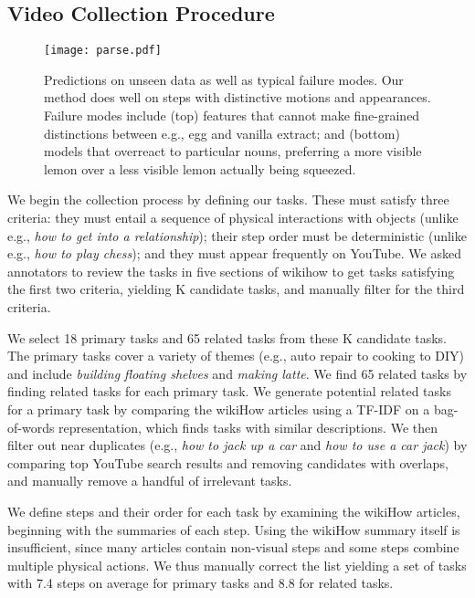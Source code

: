 \documentclass[10pt,twocolumn,letterpaper]{article}
\begin{document}
\subsection{Video Collection Procedure}
\label{subsec:video_collection}

\begin{figure*}[t]
\texttt{[image: parse.pdf]}
\caption{Predictions on unseen data as well as typical failure modes. Our method does well on steps with distinctive motions and appearances.
Failure modes include (top) features that cannot make
fine-grained distinctions between e.g., egg and vanilla extract; and
(bottom) models that overreact to particular nouns, preferring a more visible lemon over
a less visible lemon actually being squeezed.}
\label{fig:exp_qualitative}
\vspace{-0.1in}
\end{figure*}

We begin the collection process by defining our tasks. These must satisfy
three criteria: they must entail a sequence of physical interactions
with objects (unlike e.g., {\it how to get into a relationship}); their
step order must be deterministic (unlike
e.g., {\it how to play chess}); and they must appear frequently
on YouTube. We asked annotators to review the tasks in five sections of wikihow
to get tasks satisfying the first two criteria, yielding K candidate tasks,
and manually filter for the third criteria.

We select 18 primary tasks and 65 related tasks from these K candidate tasks. The
primary tasks cover a variety of themes (e.g.,  auto repair to
cooking to DIY) and include
{\it building floating shelves} and {\it making latte}.
We find 65 related tasks by finding related tasks for each
primary task. We generate potential related tasks for a primary task by comparing the wikiHow
articles using a TF-IDF on a bag-of-words representation, which finds tasks with similar descriptions.
We then filter out near duplicates (e.g., {\it how to jack up a car} and {\it how to use a car jack}) by comparing top YouTube search results and removing candidates with overlaps, and manually remove a handful of irrelevant tasks.

We define steps and their order for each task by examining the
wikiHow articles, beginning with the summaries of each step. Using the wikiHow
summary itself is insufficient, since many articles contain non-visual steps and some steps combine multiple
physical actions. We thus manually correct the list yielding a set of tasks with 7.4 steps on average for primary tasks and 8.8 for related tasks.
\end{document}
